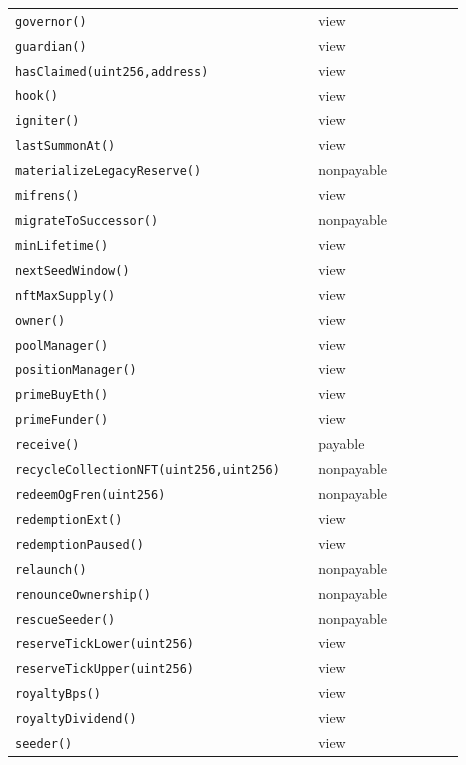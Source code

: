 \begin{longtable}{@{}p{0.62\linewidth}p{0.30\linewidth}@{}}
\texttt{\scriptsize governor()} & view \\
\texttt{\scriptsize guardian()} & view \\
\texttt{\scriptsize hasClaimed(uint256,address)} & view \\
\texttt{\scriptsize hook()} & view \\
\texttt{\scriptsize igniter()} & view \\
\texttt{\scriptsize lastSummonAt()} & view \\
\texttt{\scriptsize materializeLegacyReserve()} & nonpayable \\
\texttt{\scriptsize mifrens()} & view \\
\texttt{\scriptsize migrateToSuccessor()} & nonpayable \\
\texttt{\scriptsize minLifetime()} & view \\
\texttt{\scriptsize nextSeedWindow()} & view \\
\texttt{\scriptsize nftMaxSupply()} & view \\
\texttt{\scriptsize owner()} & view \\
\texttt{\scriptsize poolManager()} & view \\
\texttt{\scriptsize positionManager()} & view \\
\texttt{\scriptsize primeBuyEth()} & view \\
\texttt{\scriptsize primeFunder()} & view \\
\texttt{\scriptsize receive()} & payable \\
\texttt{\scriptsize recycleCollectionNFT(uint256,uint256)} & nonpayable \\
\texttt{\scriptsize redeemOgFren(uint256)} & nonpayable \\
\texttt{\scriptsize redemptionExt()} & view \\
\texttt{\scriptsize redemptionPaused()} & view \\
\texttt{\scriptsize relaunch()} & nonpayable \\
\texttt{\scriptsize renounceOwnership()} & nonpayable \\
\texttt{\scriptsize rescueSeeder()} & nonpayable \\
\texttt{\scriptsize reserveTickLower(uint256)} & view \\
\texttt{\scriptsize reserveTickUpper(uint256)} & view \\
\texttt{\scriptsize royaltyBps()} & view \\
\texttt{\scriptsize royaltyDividend()} & view \\
\texttt{\scriptsize seeder()} & view \\

\end{longtable}
